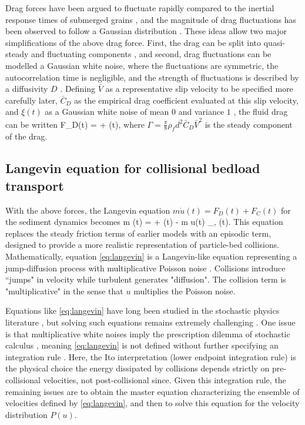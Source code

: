 Drag forces have been argued to fluctuate rapidly compared to the inertial response times of submerged grains \citep{Fan2014}, and the magnitude of drag fluctuations has been observed to follow a Gaussian distribution \citep{Hofland2006,Schmeeckle2007,Dwivedi2010,Celik2014}.
These ideas allow two major simplifications of the above drag force.
First, the drag can be split into quasi-steady and fluctuating components \citep{Michaelides1997}, and second, drag fluctuations can be modelled a Gaussian white noise, where the fluctuations are symmetric, the autocorrelation time is negligible, and the strength of fluctuations is described by a diffusivity $D$ \citep{Fan2014,Ancey2014}. 
Defining $\bar{V}$ as a representative slip velocity to be specified more carefully later,  $\bar{C}_D$ as the empirical drag coefficient evaluated at this slip velocity, and $\xi(t)$ as a Gaussian white noise of mean $0$ and variance $1$ \citep{Gardiner1983}, the fluid drag can be written
\be F_D(t) = \Gamma +  \eta(t), \label{eq:drag}\ee
where $\Gamma = \frac{\pi}{8}
\rho_f d^2 \bar{C}_D \bar{V}^2$ is the steady component of the drag.

\subsection{Langevin equation for collisional bedload transport}

With the above forces, the Langevin equation $m\dot{u}(t) = F_D(t) + F_C(t)$ for the sediment dynamics becomes
\be m (t) = \Gamma + \eta(t) - m u(t) \xi_{\nu, \ve}(t). \label{eq:langevin} \ee
This equation replaces the steady friction terms of earlier models with an episodic term, designed to provide a more realistic representation of particle-bed collisions.
Mathematically, equation \ref{eq:langevin} is a Langevin-like equation representing a jump-diffusion process \citep{Daly2006} with multiplicative Poisson noise \citep{Dubkov2016,Denisov2009}. 
Collisions introduce ``jumps" in velocity while turbulent generates "diffusion". The collision term is "multiplicative" in the sense that $u$ multiplies the Poisson noise.

Equations like \ref{eq:langevin} have long been studied in the stochastic physics literature \citep{Hanggi1978,VanDenBroeck1983}, but solving such equations remains extremely challenging \citep{Daly2010,Mau2014,Dubkov2019}.
One issue is that multiplicative white noises imply the prescription dilemma of stochastic calculus \citep{Risken1989,Gardiner1983}, meaning \ref{eq:langevin} is not defined without further specifying an integration rule \citep{Suweis2011}.
Here, the Ito interpretation (lower endpoint integration rule) is the physical choice the energy dissipated by collisions depends strictly on pre-collisional velocities, not post-collisional \citep[e.g.][]{Gardiner1983} since.
Given this integration rule, the remaining issues are to obtain the master equation characterizing the ensemble of velocities defined by \ref{eq:langevin}, and then to solve this equation for the velocity distribution $P(u)$.

